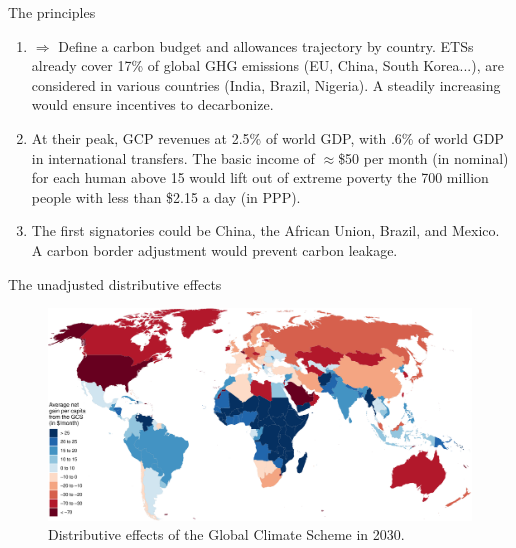 \documentclass[aspectratio=169,xcolor=dvipsnames, 11pt,mathserif]{beamer}
\begin{document}
\begin{framefont}{\small}
\begin{frame}{The principles}
    \begin{enumerate}[<+->]
        \item {}
        \bbvsp \ip $\Rightarrow$ Define a carbon budget and allowances trajectory by country.
        \ip ETSs already cover 17\% of global GHG emissions (EU, China, South Korea...), are considered in various countries (India, Brazil, Nigeria).
        \ip A steadily increasing  would ensure incentives to decarbonize.
        \ee
        \item {}
        \bbvsp \ip At their peak, GCP revenues at 2.5\% of world GDP, with .6\% of world GDP in international transfers. 
        \ip The basic income of $\approx$\$50 per month (in nominal) for each human above 15 would lift out of extreme poverty the 700 million people with less than \$2.15 a day (in PPP).
        \ee
        \item {}
        \bbvsp \ip The first signatories could be China, the African Union, Brazil, and Mexico. %
        \ip A carbon border adjustment would prevent carbon leakage. \ee %
    \end{enumerate}
\end{frame}

\begin{frame}{The unadjusted distributive effects}
    \begin{figure}
        \centering 
        \caption{Distributive effects of the Global Climate Scheme in 2030.}
        \includegraphics[height=.8\textheight]{../figures/maps/mean_gain_2030.pdf} 
    \end{figure}        
\end{frame}


\end{framefont}
\end{document}
